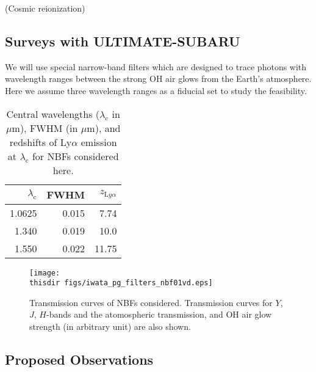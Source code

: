 (Cosmic reionization)


\subsection{Surveys with ULTIMATE-SUBARU}

We will use special narrow-band filters which are designed to trace
photons with wavelength ranges between the strong OH air glows from the
Earth's atmosphere.
Here we assume three wavelength ranges as a fiducial set to study the
feasibility.

\begin{table}[!ht]
\begin{center}
\begin{tabular}{rrr}
\hline
$\lambda_\mathrm{c}$ & FWHM & $z_{\mathrm Ly\alpha}$\\
\hline
1.0625 & 0.015  &  7.74\\
1.340  & 0.019  & 10.0 \\
1.550  & 0.022  & 11.75\\
\hline
\end{tabular}
\end{center}
\caption{
Central wavelengths ($\lambda_\mathrm{c}$ in $\mu$m), FWHM (in $\mu$m),
 and redshifts of Ly$\alpha$ emission at $\lambda_\mathrm{c}$ for NBFs
 considered here.
}
\label{tab:iwata_nbf_setup}
\end{table}

\begin{figure}[!ht]
\centerline{
\texttt{[image: \\thisdir figs/iwata\_pg\_filters\_nbf01vd.eps]}
}
\caption{
Transmission curves of NBFs considered. Transmission curves for $Y$,
 $J$, $H$-bands and the atomospheric transmission, and OH air glow
 strength (in arbitrary unit) are also shown.
}
\label{fig:iwata_filter_nbf}
\end{figure}



\par{}

\subsection{Proposed Observations}

\par{}

\par{}

